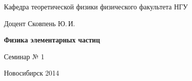 \documentclass[12pt,pagesize,paper=landscape,paper=192mm:108mm]{scrbook}
\begin{document}
\begin{titlepage}
\begin{center}
    Кафедра теоретической физики физического факультета НГУ
    \medskip

    \Large
    Доцент Сковпень Ю.\,И.
    \medskip

    \huge
    \textbf{Физика элементарных частиц}
    \bigskip

    \Large
    Семинар № 1
    \vfill

    \normalsize
    \vfill

    \normalsize \ccbysa\hspace{0.5em}  Новосибирск 2014
  \end{center}
\end{titlepage}
\end{document}
